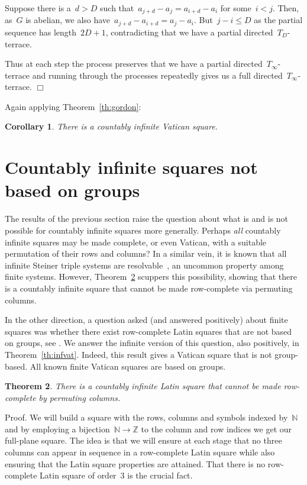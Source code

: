 \documentclass[12pt,a4paper]{article}
\newtheorem{thm}{Theorem}
\newtheorem{cor}[thm]{Corollary}
\newcommand{\Z}{\mathbb{Z}}
\newcommand{\N}{\mathbb{N}}
\newcommand{\qed}{\unskip\protect\nolinebreak\mbox{\quad$\Box$}\vspace{3mm}}
\begin{document}
Suppose there is a~$d > D$ such that~$a_{j+d} - a_j = a_{i+d} - a_i$ for some~$i<j$.  Then, as~$G$ is abelian, we also have~$a_{j+d} - a_{i+d} = a_{j} - a_i$.  But~$j-i \leq D$ as the partial sequence has length~$2D+1$, contradicting that we have a partial directed~$T_D$-terrace.

Thus at each step the process preserves that we have a partial directed~$T_{\infty}$-terrace and running through the processes repeatedly gives us a full directed~$T_{\infty}$-terrace. 
\qed

Again applying Theorem~\ref{th:gordon}:

\begin{cor}
There is a countably infinite Vatican square.
\end{cor}


\section{Countably infinite squares not based on groups}\label{sec:cisqs}


The results of the previous section raise the question about what is and is not possible for countably infinite squares more generally.   Perhaps {\em all} countably infinite squares may be made complete, or even Vatican, with a suitable permutation of their rows and columns?   In a similar vein, it is known that all infinite Steiner triple systems are resolvable~\cite{DHW14}, an uncommon property among finite systems. However, Theorem~\ref{th:notrcls} scuppers this possibility, showing that there is a countably infinite square that cannot be made row-complete via permuting columns.

In the other direction, a question asked (and answered positively) about finite squares was whether there exist row-complete Latin squares that are not based on groups, see \cite{CE91, DK, Owens76}.  We answer the infinite version of this question, also positively, in Theorem~\ref{th:infvat}.  Indeed, this result gives a Vatican square that is not group-based.  All known finite Vatican squares are based on groups.

\begin{thm}\label{th:notrcls}
There is a countably infinite Latin square that cannot be made row-complete by permuting columns.
\end{thm}

\noindent
Proof.
We will build a square with the rows, columns and symbols indexed by~$\N$ and by employing a bijection~$\N \rightarrow \Z$ to the column and row indices we get our full-plane square.  The idea is that we will ensure at each stage that no three columns can appear in sequence in a row-complete Latin square while also ensuring that the Latin square properties are attained.  That there is no row-complete Latin square of order~3 is the crucial fact.
\end{document}

